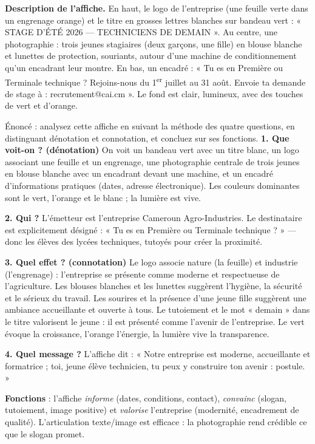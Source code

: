 \documentclass[11pt]{article}
\begin{document}
\textbf{Description de l'affiche.} En haut, le logo de l'entreprise (une feuille verte dans un engrenage orange) et le titre en grosses lettres blanches sur bandeau vert : « STAGE D'ÉTÉ 2026 — TECHNICIENS DE DEMAIN ». Au centre, une photographie : trois jeunes stagiaires (deux garçons, une fille) en blouse blanche et lunettes de protection, souriants, autour d'une machine de conditionnement qu'un encadrant leur montre. En bas, un encadré : « Tu es en Première ou Terminale technique ? Rejoins-nous du 1\textsuperscript{er} juillet au 31 août. Envoie ta demande de stage à : recrutement@cai.cm ». Le fond est clair, lumineux, avec des touches de vert et d'orange.

\begin{exoresolu}
Énoncé : analysez cette affiche en suivant la méthode des quatre questions, en distinguant dénotation et connotation, et concluez sur ses fonctions.
\tcblower
\textbf{1. Que voit-on ? (dénotation)} On voit un bandeau vert avec un titre blanc, un logo associant une feuille et un engrenage, une photographie centrale de trois jeunes en blouse blanche avec un encadrant devant une machine, et un encadré d'informations pratiques (dates, adresse électronique). Les couleurs dominantes sont le vert, l'orange et le blanc ; la lumière est vive.

\textbf{2. Qui ?} L'émetteur est l'entreprise Cameroun Agro-Industries. Le destinataire est explicitement désigné : « Tu es en Première ou Terminale technique ? » — donc les élèves des lycées techniques, tutoyés pour créer la proximité.

\textbf{3. Quel effet ? (connotation)} Le logo associe nature (la feuille) et industrie (l'engrenage) : l'entreprise se présente comme moderne et respectueuse de l'agriculture. Les blouses blanches et les lunettes suggèrent l'hygiène, la sécurité et le sérieux du travail. Les sourires et la présence d'une jeune fille suggèrent une ambiance accueillante et ouverte à tous. Le tutoiement et le mot « demain » dans le titre valorisent le jeune : il est présenté comme l'avenir de l'entreprise. Le vert évoque la croissance, l'orange l'énergie, la lumière vive la transparence.

\textbf{4. Quel message ?} L'affiche dit : « Notre entreprise est moderne, accueillante et formatrice ; toi, jeune élève technicien, tu peux y construire ton avenir : postule. »

\textbf{Fonctions} : l'affiche \emph{informe} (dates, conditions, contact), \emph{convainc} (slogan, tutoiement, image positive) et \emph{valorise} l'entreprise (modernité, encadrement de qualité). L'articulation texte/image est efficace : la photographie rend crédible ce que le slogan promet.
\end{exoresolu}
\end{document}
